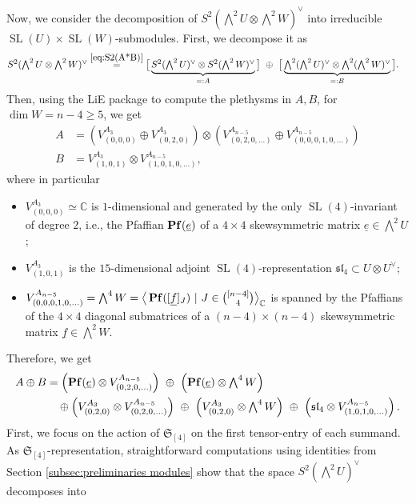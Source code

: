 \documentclass[11pt,reqno]{amsart}
\theoremstyle{definition}
\numberwithin{theorem}{section}
\DeclareMathOperator{\Pf}{\bf Pf}
\DeclareMathOperator{\SL}{SL}
\numberwithin{equation}{section}
\begin{document}
\indent Now, we consider the decomposition of $S^2(\bigwedge^2U \otimes \bigwedge^2W)^\vee$ into irreducible $\SL(U)\times \SL(W)$-submodules. First, we decompose it as
\begin{align*}
\textstyle{S^2(\bigwedge^2U \otimes \bigwedge^2W)^\vee} & \stackrel{\eqref{eq:S2(A*B)}}{=}  \big[\underbrace{\textstyle{S^2(\bigwedge^2U)^\vee \otimes S^2(\bigwedge^2W)^\vee}}_{=: A}\big] \ \oplus \ \big[\underbrace{\textstyle{\bigwedge^2(\bigwedge^2U)^\vee \otimes \bigwedge^2(\bigwedge^2W)^\vee}}_{=: B}\big]  .
\end{align*}
\noindent Then, using the LiE package \cite{LiE} to compute the plethysms in $A,B$, for $\dim W = n-4 \geq 5$, we get
\begin{align*}
A & = \left( V^{A_3}_{(0,0,0)} \oplus V^{A_{3}}_{(0,2,0)} \right) \otimes \left( V^{A_{n-5}}_{(0,2,0, \ldots)} \oplus V^{A_{n-5}}_{(0,0,0,1,0, \ldots)} \right)  \\
B & =  V_{(1,0,1)}^{A_3}\otimes V_{(1,0,1,0, \ldots )}^{A_{n-5}}, 
\end{align*}
where in particular
\begin{itemize}
\item $V^{A_3}_{(0,0,0)}\simeq \mathbb C$ is $1$-dimensional and generated by the only $\SL(4)$-invariant of degree $2$, i.e., the Pfaffian $\Pf(\underline{e})$ of a $4\times 4$ skewsymmetric matrix $\underline{e}\in \bigwedge^2U$;
\item $V_{(1,0,1)}^{A_3}$ is the $15$-dimensional adjoint $\SL(4)$-representation $\mathfrak{sl}_4\subset U \otimes U^\vee$;
\item $V^{A_{n-5}}_{(0,0,0,1,0,\ldots)} = \bigwedge^4W = \big\langle \Pf([\underline{f}]_J) \ | \ J \in \binom{[n-4]}{4} \big\rangle_\mathbb C$ is spanned by the Pfaffians of the $4\times 4$ diagonal submatrices of a $(n-4)\times (n-4)$ skewsymmetric matrix $\underline{f}\in \bigwedge^2W$.
\end{itemize}
Therefore, we get
\begin{align}\label{eq:A+B}
A\oplus B & = \left(\Pf(\underline{e}) \otimes V^{A_{n-5}}_{(0,2,0, \ldots)}\right) \ \oplus \ \left( \Pf(\underline{e}) \otimes \textstyle{\bigwedge^4 W} \right) \ \nonumber \\
& \ \ \ \oplus \left( V^{A_{3}}_{(0,2,0)} \otimes V^{A_{n-5}}_{(0,2,0, \ldots)} \right) \ \oplus \ \left( V^{A_{3}}_{(0,2,0)} \otimes \textstyle{\bigwedge^4 W} \right) \ \oplus \ \left( \mathfrak{sl}_4 \otimes V_{(1,0,1,0, \ldots )}^{A_{n-5}} \right) .
\end{align}
\indent First, we focus on the action of $\mathfrak{S}_{[4]}$ on the first tensor-entry of each summand. As $\mathfrak{S}_{[4]}$-representation, straightforward computations using identities from Section \ref{subsec:preliminaries modules} show that the space $S^2(\bigwedge^2U)^\vee$  decomposes into
\end{document}
